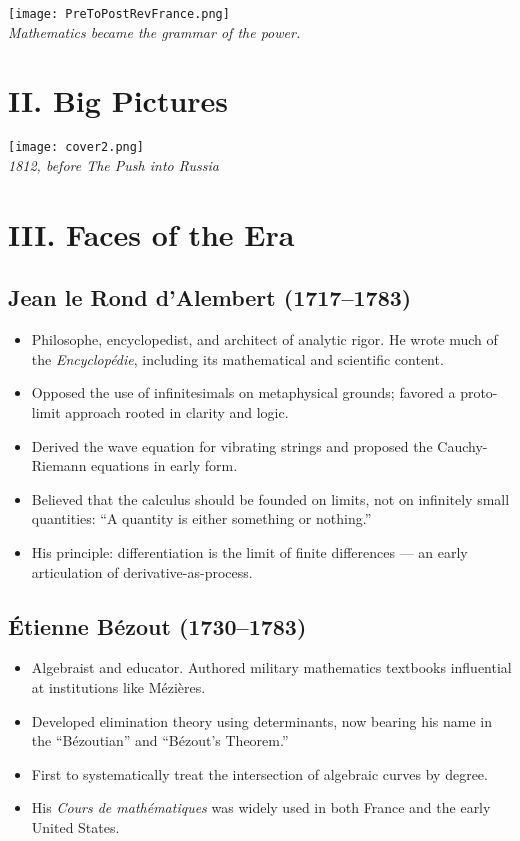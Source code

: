 \documentclass[9pt]{article}
\begin{document}
\begin{center}
    \texttt{[image: PreToPostRevFrance.png]}\\
    \textit{Mathematics became the grammar of the power.}
\end{center}

\newpage

\section*{II. Big Pictures}

\begin{center}
    \texttt{[image: cover2.png]}\\
    \vspace{1em}
    \textit{1812, before The Push into Russia}
\end{center}

\newpage

\section*{III. Faces of the Era}

\subsection*{Jean le Rond d’Alembert (1717–1783)}
\begin{itemize}
  \item Philosophe, encyclopedist, and architect of analytic rigor. He wrote much of the \textit{Encyclopédie}, including its mathematical and scientific content.
  \item Opposed the use of infinitesimals on metaphysical grounds; favored a proto-limit approach rooted in clarity and logic.
  \item Derived the wave equation for vibrating strings and proposed the Cauchy-Riemann equations in early form.
  \item Believed that the calculus should be founded on limits, not on infinitely small quantities: “A quantity is either something or nothing.”
  \item His principle: differentiation is the limit of finite differences — an early articulation of derivative-as-process.
\end{itemize}

\subsection*{Étienne Bézout (1730–1783)}
\begin{itemize}
  \item Algebraist and educator. Authored military mathematics textbooks influential at institutions like Mézières.
  \item Developed elimination theory using determinants, now bearing his name in the “Bézoutian” and “Bézout’s Theorem.”
  \item First to systematically treat the intersection of algebraic curves by degree.
  \item His \textit{Cours de mathématiques} was widely used in both France and the early United States.
\end{itemize}
\end{document}
